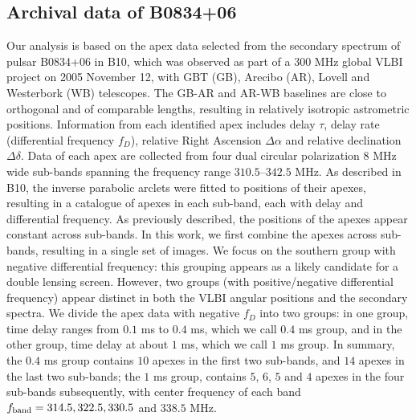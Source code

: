 \documentclass[useAMS,usenatbib]{mn2e}
\begin{document}
\subsection{Archival data of B0834+06}
\label{21}
Our analysis is based on the apex data selected from the secondary
spectrum of pulsar B0834+06 in B10, which was
observed as part of a 300 MHz global VLBI project on 2005 November 12, with
GBT (GB), Arecibo (AR), Lovell and Westerbork (WB) telescopes.  The GB-AR and AR-WB
baselines are close to orthogonal and of comparable lengths, resulting
in relatively isotropic astrometric positions.
Information from each identified apex includes delay $\tau$,
delay rate (differential frequency $f_D$), relative Right Ascension
$\Delta\alpha$ and relative declination $\Delta\delta$.
Data of each apex are collected from four dual circular polarization $8$ MHz wide sub-bands spanning the frequency range $310.5$--$342.5$ MHz. 
As described in B10, the inverse parabolic
arclets were fitted to positions of their apexes, resulting in a
catalogue of apexes in each sub-band, each with delay and differential
frequency.  As previously described, the positions of the apexes
appear constant across sub-bands.  In this work, we first combine the
apexes across sub-bands, resulting in a single set of images.  We focus on
the southern group with negative differential frequency: this
grouping appears as a likely candidate for a double lensing screen. However, two groups (with positive/negative differential frequency) appear distinct in both the VLBI angular positions and the secondary spectra. We divide the apex data with negative $f_D$ into two
groups: in one group, time delay ranges from $0.1$ ms to $0.4$ ms,
which we call $0.4$ ms group, and in the other group, time delay at
about $1$ ms, which we call $1$ ms group.  In summary, the
$0.4$ ms group contains $10$ apexes in the first two sub-bands, and $14$ apexes in the last two sub-bands; the $1$ ms group, contains $5$, $6$, $5$ and $4$ apexes in the four sub-bands subsequently, with center frequency of each band $f_{\rm band}=314.5, 322.5, 330.5$ and $ 338.5$ MHz. 
\end{document}
